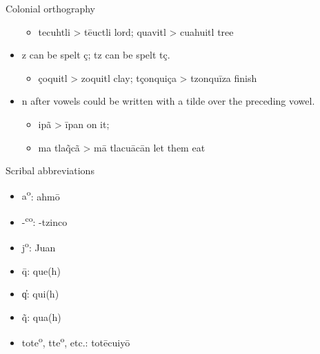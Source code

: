 \documentclass[12pt]{beamer}
\newcommand{\nah}[1]{\textcolor{nahgrn}{#1}}
\newcommand{\trs}[1]{\textcolor{nahblu}{#1}}
\begin{document}
\begin{frame}
\begin{columns}[t]
\begin{column}{.22\linewidth}
\begin{block}{Colonial orthography}
\begin{itemize}
\begin{itemize}
          \item \nah{tecuhtli} > \nah{tēuctli} \trs{lord}; \nah{quavitl} > \nah{cuahuitl} \trs{tree}
          \end{itemize}
        \item \nah{z} can be spelt \nah{ç}; \nah{tz} can be spelt \nah{tç}.
          \begin{itemize}
          \item \nah{çoquitl} > \nah{zoquitl} \trs{clay}; \nah{tçonquiça} > \nah{tzonquīza} \trs{finish}
          \end{itemize}
        \item \nah{n} after vowels could be written with a tilde over the preceding vowel.
          \begin{itemize}
          \item \nah{ipã} > \nah{īpan} \trs{on it}; 
          \item \nah{ma tla\~qcã} > \nah{mā tlacuācān} \trs{let them eat}
          \end{itemize}
        \end{itemize}
      \end{block}
      \begin{block}{Scribal abbreviations}
        \vspace{-1.5ex}
        \begin{multicols}{2}
          \begin{itemize}
          \item \nah{a\textsuperscript{o}}: \nah{ahmō}
          \item \nah{-\textsuperscript{co}}: \nah{-tzinco}
          \item \nah{j\textsuperscript{o}}: \nah{Juan}
          \item \nah{\={q}}: \nah{que(h)}
          \item \nah{‍q̓}: \nah{qui(h)}
          \item \nah{\~{q}}: \nah{qua(h)}
          \item \nah{tote\textsuperscript{o}, tte\textsuperscript{o}}, etc.: \nah{totēcuiyō}


\end{itemize}
\end{multicols}
\end{block}
\end{column}
\end{columns}
\end{frame}
\end{document}
